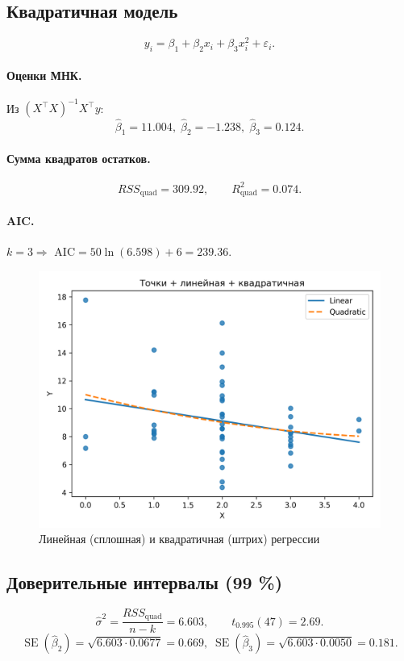 \documentclass[areasetadvanced]{scrartcl}
\begin{document}
\subsection{Квадратичная модель}
\[
y_i=\beta_1+\beta_2x_i+\beta_3x_i^2+\varepsilon_i.
\]

\paragraph{Оценки МНК.}
Из $(X^\top X)^{-1}X^\top y$:
\[
\hat\beta_1=11.004,\;
\hat\beta_2=-1.238,\;
\hat\beta_3=0.124.
\]

\paragraph{Сумма квадратов остатков.}
\[
RSS_{\text{quad}}=309.92,\qquad
R^2_{\text{quad}}=0.074.
\]

\paragraph{AIC.}
$k=3\Rightarrow$
\(
\text{AIC}=50\ln(6.598)+6 = 239.36.
\)

\begin{figure}[H]
  \centering
  \includegraphics[width=.55\textwidth]{figs/task1_lin_quad.png}
  \caption{Линейная (сплошная) и квадратичная (штрих) регрессии}
\end{figure}

\subsection{Доверительные интервалы (99 \%)}
\[
\hat\sigma^2=\frac{RSS_{\text{quad}}}{n-k}=6.603,\qquad
t_{0.995}(47)=2.69.
\]
\[
\operatorname{SE}(\hat\beta_2)=\sqrt{6.603\cdot0.0677}=0.669,\;
\operatorname{SE}(\hat\beta_3)=\sqrt{6.603\cdot0.0050}=0.181.
\]
\end{document}

